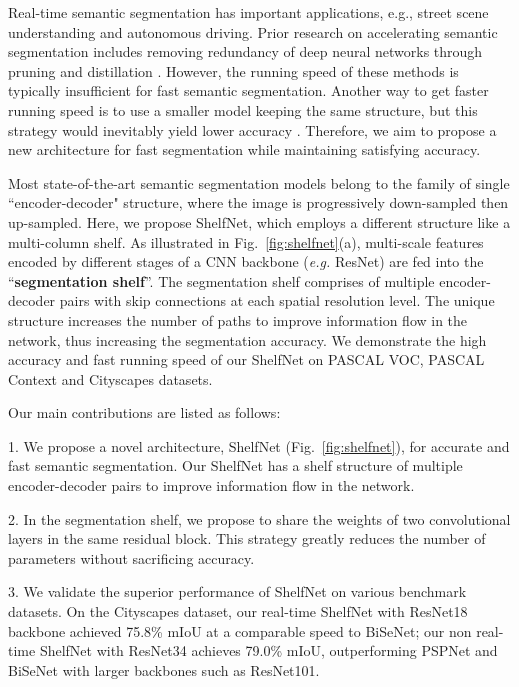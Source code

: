 \documentclass[10pt,twocolumn,letterpaper]{article}
\begin{document}
Real-time semantic segmentation has important applications, e.g., street scene understanding and autonomous driving. Prior research on accelerating semantic segmentation includes removing redundancy of deep neural networks through pruning \cite{han2015deep,han2015learning,hassibi1993second} and distillation \cite{papernot2016distillation,hinton2015distilling,romero2014fitnets}. However, the running speed of these methods is typically insufficient for fast semantic segmentation. Another way to get faster running speed is to use a smaller model keeping the same structure, but this strategy  would inevitably yield lower accuracy \cite{zhao2017icnet}. Therefore, we aim to propose a new architecture for fast segmentation while maintaining satisfying accuracy. 




Most state-of-the-art semantic segmentation models belong to the family of single ``encoder-decoder" structure, where the image is progressively down-sampled then up-sampled. Here, we propose ShelfNet, which employs a different structure like a multi-column shelf. As illustrated in Fig.~\ref{fig:shelfnet}(a), multi-scale features encoded by different stages of a CNN backbone (\textit{e.g.} ResNet) are fed into the ``\textbf{segmentation shelf}''. The segmentation shelf comprises of  multiple encoder-decoder pairs with skip connections at each spatial resolution level. The unique structure increases the number of paths to improve information flow in the network, thus increasing the segmentation accuracy. We demonstrate the high accuracy and fast running speed of our ShelfNet on PASCAL VOC, PASCAL Context and Cityscapes datasets. 





Our main contributions are listed as follows:

1. We propose a novel architecture, ShelfNet (Fig.~\ref{fig:shelfnet}), for accurate and fast semantic segmentation. Our ShelfNet has a shelf structure of multiple encoder-decoder pairs to improve information flow in the network.

2. In the segmentation shelf, we propose to share the weights of two convolutional layers in the same residual block. This strategy greatly reduces the number of parameters without sacrificing accuracy.

3. We validate the superior performance of ShelfNet on various benchmark datasets. On the Cityscapes dataset, our real-time ShelfNet with ResNet18 backbone achieved 75.8\% mIoU at a comparable speed to BiSeNet; our non real-time ShelfNet with ResNet34 achieves 79.0\% mIoU, outperforming PSPNet and BiSeNet with larger backbones such as ResNet101.
\end{document}
